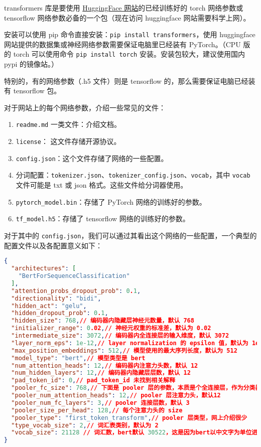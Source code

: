 
\begin{issues}
\issueDraft
\end{issues}

transformers 库是要使用 \href{https://huggingface.co}{HuggingFace 网站}的已经训练好的 torch 网络参数或 tensorflow 网络参数必备的一个包（现在访问 huggingface 网站需要科学上网）。

安装可以使用 pip 命令直接安装：\verb`pip install transformers`，使用 huggingface 网站提供的数据集或神经网络参数需要保证电脑里已经装有 PyTorch。（CPU 版的 torch 可以使用命令 \verb`pip install torch` 安装。安装包较大，建议使用国内 pypi 的镜像站。）

特别的，有的网络参数（.h5 文件）则是 tensorflow 的，那么需要保证电脑已经装有 tensorflow 包。

对于网站上的每个网络参数，介绍一些常见的文件：
\begin{enumerate}
\item \verb`readme.md` 一类文件：介绍文档。
\item \verb`license`： 这文件存储开源协议。
\item \verb`config.json`：这个文件存储了网络的一些配置。
\item 分词配置：\verb`tokenizer.json`、\verb`tokenizer_config.json`、\verb`vocab`，其中 \verb`vocab` 文件可能是 txt 或 json 格式。这些文件给分词器使用。
\item \verb`pytorch_model.bin`：存储了 PyTorch 网络的训练好的参数。
\item \verb`tf_model.h5`：存储了 tensorflow 网络的训练好的参数。
\end{enumerate}

对于其中的 \verb`config.json`，我们可以通过其看出这个网络的一些配置，一个典型的配置文件以及各配置意义如下：
\begin{lstlisting}[language=json]
{
  "architectures": [
    "BertForSequenceClassification"
  ],
  "attention_probs_dropout_prob": 0.1,
  "directionality": "bidi",
  "hidden_act": "gelu",
  "hidden_dropout_prob": 0.1,
  "hidden_size": 768,// 编码器内隐藏层神经元数量，默认 768
  "initializer_range": 0.02,// 神经元权重的标准差，默认为 0.02
  "intermediate_size": 3072,// 编码器内全连接层的输入维度，默认 3072
  "layer_norm_eps": 1e-12,// layer normalization 的 epsilon 值，默认为 1e-12
  "max_position_embeddings": 512,// 模型使用的最大序列长度，默认为 512
  "model_type": "bert",// 模型类型是 bert
  "num_attention_heads": 12,// 编码器内注意力头数，默认 12
  "num_hidden_layers": 12,// 编码器内隐藏层层数，默认 12
  "pad_token_id": 0,// pad_token_id 未找到相关解释
  "pooler_fc_size": 768,// 下面是 pooler 层的参数，本质是个全连接层，作为分类器解决序列级的NLP任务
  "pooler_num_attention_heads": 12,// pooler 层注意力头，默认12
  "pooler_num_fc_layers": 3,// pooler 连接层数，默认 3
  "pooler_size_per_head": 128,// 每个注意力头的 size
  "pooler_type": "first_token_transform",// pooler 层类型，网上介绍很少
  "type_vocab_size": 2,// 词汇表类别，默认为 2
  "vocab_size": 21128 // 词汇数，bert默认 30522，这是因为bert以中文字为单位进入输入
}
\end{lstlisting}

